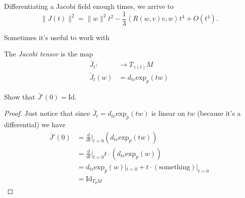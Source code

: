 \begin{proposition}
\label{proposition-Jacobi-field-Taylor-expansion}
Differentiating a Jacobi field enough times, we arrive to
\begin{equation}
\label{equation-Jacobi-field-Taylor-expansion}
\|J(t)\|^2=\|w\|^2t^2-\frac{1}{3}\left<R(w,v)v,w\right>t^4+O(t^4).
\end{equation}
\end{proposition}

Sometimes it's useful to work with

\begin{definition}
\label{definition-Jacobi-tensor}
The {\it Jacobi tensor} is the map
\begin{align*}
	\overline{J}_t:  &\longrightarrow T_{\gamma(t)}M \\
	 \overline{J}_t(w)&=d_{tv}\text{exp}_p(tw)
\end{align*}
\end{definition}

\begin{exercise}
\label{exercise-Jacobi-tensor-derivative}
Show that $\bar{J}'(0)=\text{Id}$.
\end{exercise}

\begin{proof}
Just notice that since $\bar{J}_t=d_{tv}\text{exp}_p(tw)$ is linear on
$tw$ (because it's a differential) we have
\begin{align*}
\overline{J}'(0)&=\frac{d}{dt}\Big|_{t=0}(d_{tv}\text{exp}_p(tw))\\
&=\frac{d}{dt}\Big|_{t=0}t\cdot (d_{tv}\text{exp}_p(w))\\
&=d_{tv}\text{exp}_p(w)|_{t=0}+t\cdot(\text{something})|_{t=0}\\
&=\text{Id}_{T_pM}
\end{align*}
\end{proof}

